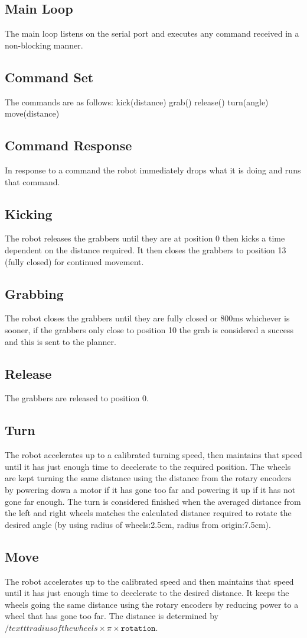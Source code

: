 \subsection{Main Loop}
The main loop listens on the serial port and executes any command received in a non-blocking manner. 
\subsection{Command Set}
The commands are as follows:
kick(distance)
grab()
release()
turn(angle)
move(distance)
\subsection{Command Response}
In response to a command the robot immediately drops what it is doing and runs that command. 
\subsection{Kicking}
The robot releases the grabbers until they are at position 0 then kicks a time dependent on the distance required. It then closes the grabbers to position 13 (fully closed) for continued movement.
\subsection{Grabbing}
The robot closes the grabbers until they are fully closed or 800ms whichever is sooner, if the grabbers only close to position 10 the grab is considered a success and this is sent to the planner. 
\subsection{Release}
The grabbers are released to position 0.
\subsection{Turn}
The robot accelerates up to a calibrated turning speed, then maintains that speed until it has just enough time to decelerate to the required position. The wheels are kept turning the same distance using the distance from the rotary encoders by powering down a motor if it has gone too far and powering it up if it has not gone far enough. The turn is considered finished when the averaged distance from the left and right wheels matches the calculated distance required to rotate the desired angle (by using radius of wheels:2.5cm, radius from origin:7.5cm). 
\subsection{Move}
The robot accelerates up to the calibrated speed and then maintains that speed until it has just enough time to decelerate to the desired distance. It keeps the wheels going the same distance using the rotary encoders by reducing power to a wheel that has gone too far. The distance is determined by $/texttt{radius of the wheels} \times \pi \times \texttt{rotation}$. 
